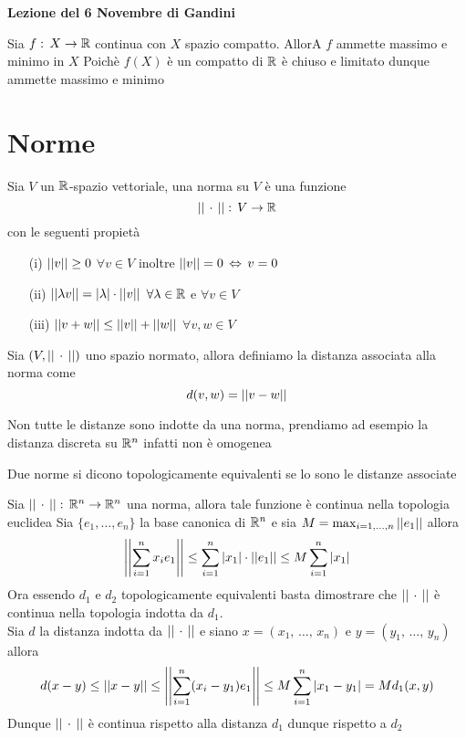 


\textbf{Lezione del 6 Novembre di Gandini}
\begin{thm}[di Weistrass]\bianco
Sia $f:\, X \to \mathbb{R}$ continua con $X$ spazio compatto. AllorA $f$ ammette massimo e minimo in $X$
\proof Poich\`e $f(X)$ \`e un compatto di $\mathbb{R}$ \`e chiuso e limitato dunque ammette massimo e minimo 
\end{thm}

\newpage
\section{Norme}
\begin{defn}Sia $V$ un $\mathbb{R}$-spazio vettoriale, una norma su $V$ \`e una funzione 
$$ \vert \vert \, \cdot \, \vert \vert :\, V \to \mathbb{R}$$ con le seguenti propiet\`a 
\begin{itemize}
\item[(i)]$\vert \vert v \vert \vert \geq 0 $ $\forall v \in V$ inoltre $\vert \vert v \vert \vert =0 \, \Leftrightarrow \, v =0 $
\item[(ii)]$\vert \vert \lambda v \vert \vert = \vert \lambda \vert \cdot \vert \vert v \vert \vert $ $\forall \lambda\in \mathbb{R}$ e $ \forall v \in V $
\item[(iii)]$\vert \vert v + w \vert \vert \leq \vert \vert v \vert \vert + \vert \vert w \vert \vert $ $\forall v, w \in V $
\end{itemize}

\end{defn}
\begin{defn}Sia $(V, \vert \vert \, \cdot \, \vert \vert)$ uno spazio normato, allora definiamo la distanza associata alla norma come 
$$ d(v,w) = \vert \vert v - w\vert \vert $$
\begin{oss}Non tutte le distanze sono indotte da una norma, prendiamo ad esempio la distanza discreta su $\mathbb{R}^n$ infatti non \`e omogenea
\end{oss}
\end{defn}
\begin{defn}Due norme si dicono topologicamente equivalenti se lo sono le distanze associate
\end{defn}
\spazio
\begin{lem}Sia $\vert \vert \, \cdot \, \vert \vert :\,\mathbb{R}^n \to \mathbb{R}^n$ una norma, allora tale funzione \`e continua nella topologia euclidea
\proof Sia $\{ e_1,\dots, e_n \}$ la base canonica di $\mathbb{R}^n$ e sia $M =\max_{i=1,\dots, n } \vert \vert e_1 \vert \vert $ allora
$$ \left\vert \left\vert \sum_{i=1}^n x_i e_1\right\vert \right\vert \leq \sum_{i=1}^n \vert x_1 \vert \cdot \vert \vert e_1 \vert \vert \leq M \sum_{i=1}^n \vert x_1 \vert $$
Ora essendo $d_1$ e $d_2$ topologicamente equivalenti basta dimostrare che $\vert \vert \, \cdot \, \vert \vert$ \`e continua nella topologia indotta da $d_1$.\\
Sia $d$ la distanza indotta da $\vert \vert \, \cdot \, \vert \vert$ e siano $x= \left( x_1 , \, \dots , \, x_n \right)$ e $y= \left( y_1 , \, \dots , \, y_n \right)$ allora 
$$ d(x-y) \leq \vert \vert x  -   y \vert \vert \leq \left\vert \left\vert \sum_{i=1}^n ( x_i - y_1) e_1 \right\vert \right\vert \leq M \sum_{i=1}^n \vert x_1 - y_1 \vert = M d_1(x,y)$$
Dunque $\vert \vert \, \cdot \, \vert \vert$ \`e continua rispetto alla distanza $d_1$ dunque rispetto a $d_2$\\
\endproof
\end{lem}
